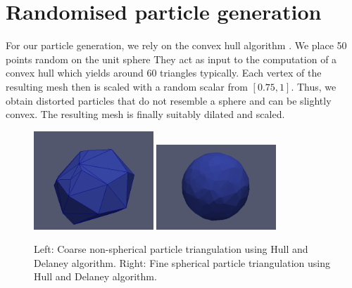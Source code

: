 \section{Randomised particle generation}
\label{section:randomised-particle-generation}

For our particle generation, we rely on the convex hull algorithm
\cite{mattutis,3,5}.
We place 50 points random on the unit sphere
They act as input to the computation of a convex hull which yields around 60
triangles typically.
Each vertex of the resulting mesh then is scaled with a random scalar from
$[0.75,1]$.
Thus, we obtain distorted particles that do not resemble a sphere and can be
slightly convex.
The resulting mesh is finally suitably dilated and scaled.

\begin{figure}
  \begin{center}
    \includegraphics[width=0.4\textwidth]{sketches/coarse.png}
    \hspace{0.2cm}
    \includegraphics[width=0.4\textwidth]{sketches/fine.png}
  \end{center}
  \caption{
    Left: Coarse non-spherical particle triangulation using Hull and Delaney algorithm.
    Right: Fine spherical particle triangulation using Hull and Delaney algorithm. 
  }
  \label{figure:particle_hull}
\end{figure}
